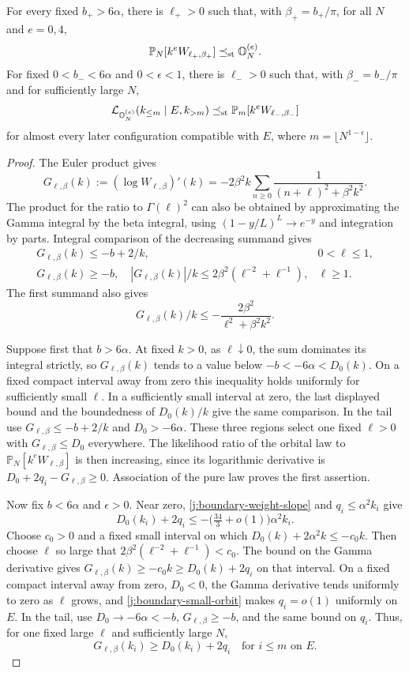 \begin{lemma}\label{j:boundary-gamma-comparison}
For every fixed $b_+>6\alpha$, there is $\ell_+>0$ such that, with
$\beta_+=b_+/\pi$, for all $N$ and $e=0,4$,
\[
 \mathbb P_N[k^e W_{\ell_+,\beta_+}]
 \preceq_{\rm st}\mathbb O_N^{(e)}.
\]
For fixed $0<b_-<6\alpha$ and $0<\epsilon<1$, there is $\ell_->0$ such
that, with $\beta_-=b_-/\pi$ and for sufficiently large $N$,
\[
 \mathcal L_{\mathbb O_N^{(e)}}(k_{\le m}\mid E,k_{>m})
 \preceq_{\rm st}\mathbb P_m[k^eW_{\ell_-,\beta_-}]
\]
for almost every later configuration compatible with $E$, where
$m=\lfloor N^{1-\epsilon}\rfloor$.
\end{lemma}

\begin{proof}
The Euler product gives
\[
 G_{\ell,\beta}(k):=(\log W_{\ell,\beta})'(k)
 =-2\beta^2k\sum_{n\ge0}
       \frac1{(n+\ell)^2+\beta^2k^2}.
\]
The product for the ratio to $\Gamma(\ell)^2$ can also be obtained by
approximating the Gamma integral by the beta integral, using
$(1-y/L)^L\to e^{-y}$ and integration by parts. Integral comparison of
the decreasing summand gives
\[
 \begin{array}{ll}
 G_{\ell,\beta}(k)\le-b+2/k,&0<\ell\le1,\\[2mm]
 G_{\ell,\beta}(k)\ge-b,\quad
 |G_{\ell,\beta}(k)|/k\le2\beta^2(\ell^{-2}+\ell^{-1}),&\ell\ge1.
 \end{array}
\]
The first summand also gives
\[
 G_{\ell,\beta}(k)/k
 \le-\frac{2\beta^2}{\ell^2+\beta^2k^2}.
\]

Suppose first that $b>6\alpha$. At fixed $k>0$, as $\ell\downarrow0$,
the sum dominates its integral strictly, so
$G_{\ell,\beta}(k)$ tends to a value below $-b<-6\alpha<D_0(k)$.
On a fixed compact interval away from zero this inequality holds uniformly
for sufficiently small $\ell$. In a sufficiently small interval at zero,
the last displayed bound and the boundedness of $D_0(k)/k$ give the same
comparison. In the tail use $G_{\ell,\beta}\le-b+2/k$ and
$D_0>-6\alpha$. These three regions select one fixed $\ell>0$ with
$G_{\ell,\beta}\le D_0$ everywhere. The likelihood ratio of the orbital
law to $\mathbb P_N[k^eW_{\ell,\beta}]$ is then increasing, since its
logarithmic derivative is $D_0+2q_i-G_{\ell,\beta}\ge0$. Association of
the pure law proves the first assertion.

Now fix $b<6\alpha$ and $\epsilon>0$. Near zero,
\eqref{j:boundary-weight-slope} and $q_i\le\alpha^2k_i$ give
\[
 D_0(k_i)+2q_i
 \le-\bigl(\tfrac{34}{3}+o(1)\bigr)\alpha^2k_i.
\]
Choose $c_0>0$ and a fixed small interval on which
$D_0(k)+2\alpha^2k\le-c_0k$. Then choose $\ell$ so large that
$2\beta^2(\ell^{-2}+\ell^{-1})<c_0$. The bound on the Gamma derivative
gives $G_{\ell,\beta}(k)\ge-c_0k\ge D_0(k)+2q_i$ on that interval.
On a fixed compact
interval away from zero, $D_0<0$, the Gamma derivative tends uniformly
to zero as $\ell$ grows, and \eqref{j:boundary-small-orbit} makes
$q_i=o(1)$ uniformly on $E$. In the tail, use
$D_0\to-6\alpha<-b$, $G_{\ell,\beta}\ge-b$, and the same bound on $q_i$.
Thus, for one fixed large $\ell$ and sufficiently large $N$,
\[
 G_{\ell,\beta}(k_i)\ge D_0(k_i)+2q_i
 \quad\text{for }i\le m\text{ on }E.
\]


\end{proof}
